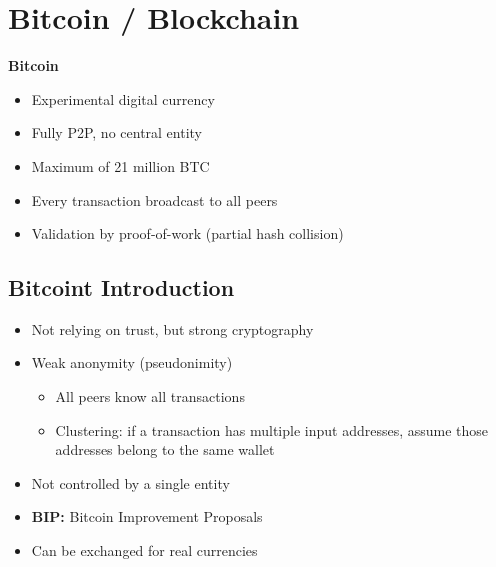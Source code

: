 
\section{Bitcoin / Blockchain}
\textbf{Bitcoin}
\begin{itemize}
    \item Experimental digital currency
    \item Fully P2P, no central entity
    \item Maximum of 21 million BTC
    \item Every transaction broadcast to all peers
    \item Validation by proof-of-work (partial hash collision)
\end{itemize}
\subsection{Bitcoint Introduction}
\begin{itemize}
    \item Not relying on trust, but strong cryptography
    \item Weak anonymity (pseudonimity)
    \begin{itemize}
        \item All peers know all transactions
        \item Clustering: if a transaction has multiple input addresses, assume those addresses belong to the same wallet
    \end{itemize}
    \item Not controlled by a single entity
    \item \textbf{BIP:} Bitcoin Improvement Proposals
    \item Can be exchanged for real currencies
\end{itemize}

